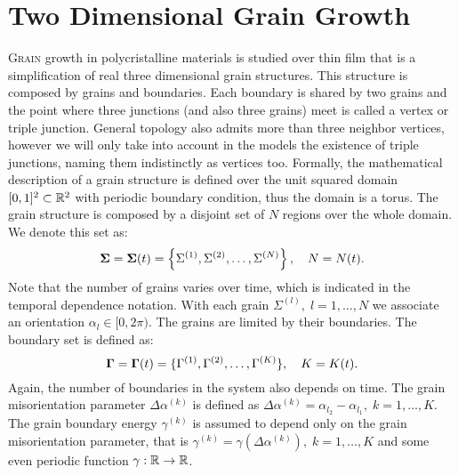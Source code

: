 \chapter{Two Dimensional Grain Growth}
\label{chap:2dgrains}

\lettrine{G}{rain} growth in polycristalline materials is studied over thin film that is a simplification of real three dimensional grain structures. This structure is composed by grains and boundaries. Each boundary is shared by two grains and the point where three junctions (and also three grains) meet is called a vertex or triple junction. General topology also admits more than three neighbor vertices, however we will only take into account in the models the existence of triple junctions, naming them indistinctly as vertices too.
 Formally, the mathematical description of a grain structure is defined over the unit squared domain $[0,1]^2 \subset \mathbb{R}^2$ with periodic boundary condition, thus the domain is a torus. The grain structure is composed by a disjoint set of $N$ regions over the whole domain. We denote this set as:
\begin{equation}
    \bm{\Sigma} = \bm{\Sigma}(t) = \left \{ \Sigma^{(1)}, \Sigma^{(2)}, \dotsc, \Sigma^{(N)} \right \},\quad N=N(t).
    \label{eq:grainsdef}
\end{equation}
Note that the number of grains varies over time, which is indicated in the temporal dependence notation. With each grain $\Sigma^{(l)},\; l = 1,\dotsc, N$ we associate an orientation $\alpha_l \in [0, 2\pi)$. The grains are limited by their boundaries. The boundary set is defined as:
\begin{equation}
    \bm{\Gamma} = \bm{\Gamma}(t) = \{\Gamma^{(1)}, \Gamma^{(2)}, \dotsc, \Gamma^{(K)}\},\quad K=K(t).
    \label{eq:boundariesdef}
\end{equation}
Again, the number of boundaries in the system also depends on time. The grain misorientation parameter $\Delta \alpha^{(k)}$ is defined as $\Delta \alpha^{(k)} = \alpha_{l_2} - \alpha_{l_1},\;k = 1,\dotsc,K$. The grain boundary energy $\gamma^{(k)}$ is assumed to depend only on the grain misorientation parameter, that is $\gamma^{(k)} = \gamma(\Delta \alpha^{(k)}),\; k = 1,\dotsc,K$ and some even periodic function $\gamma: \mathbb{R} \rightarrow \mathbb{R}$.

